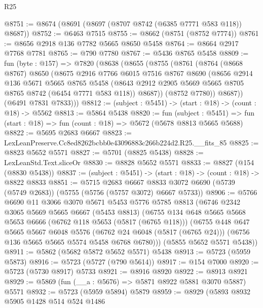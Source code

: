 \begin{lexlean}{R25}
\begin{coremodule}
@8751 := @8674 (@8691 (@8697 (@8707 @8742 (@6385 @7771 @583 @118)) @8687))
@8752 := @6463 @7515
@8755 := @8662 (@8751 (@8752 @7774))
@8761 := @8656 @2918 @136 @7782 @5665 @8650 @5458
@8764 := @8664 @2917 @7768 @7781
@8765 := @790 @7780
@8767 := @5436 @8765 @5458
@8809 := fun (byte : @157) =>
  @7820
    (@8638
      (@8655
        (@8755
          (@8761
            (@8764
              (@8668 @8767)
              @8650
              (@8675
                @2916
                @7766
                @6015
                @7516
                @8767
                @8690
                (@8656
                  @2914
                  @136
                  @5671
                  @5665
                  @8765
                  @5458
                  (@8643 @2912 @2905 @5669 @5665 @8705 @8765 @8742 (@6454 @7771 @583 @118))
                  @8687))
              (@8752 @7780))
            @8687))
        (@6491 @7831 @7833)))
@8812 := (subject : @5451) -> (start : @18) -> (count : @18) -> @5562
@8813 := @5864 @5438
@8820 := fun (subject : @5451) =>
  fun (start : @18) => fun (count : @18) => @5672 (@5678 @8813 @5665 @5688)
@8822 := @5695 @2683 @6667
@8823 := LexLeanPreserve.Cc8ed8262bcbb0e43096883c266b224d2.R25.__fits_85
@8825 := @8823 @5652 @5571
@8827 := @5701 (@8825 @5438)
@8828 := LexLeanStd.Text.sliceOr
@8830 := @8828 @5652 @5571
@8833 := @8827 (@154 (@8830 @5438))
@8837 := (subject : @5451) -> (start : @18) -> (count : @18) -> @8822 @8833
@8851 := @5715
    @2683
    @6667
    @8833
    @3072
    @6690
    (@5739 (@5749 @2683))
    (@5755 (@5756 (@5757 @3072) @6667 @5733))
@8906 := @5766
    @6690
    @11
    @3066
    @3070
    @5671
    @5453
    @5776
    @5785
    @8813
    (@6746
      @2342
      @3065
      @5669
      @5665
      @6667
      (@5453 @8813)
      (@6755
        @134
        @648
        @5665
        @5668
        @5653
        @6666
        (@6762 @118 @5653 (@5817 (@6765 @118)))
        (@6755
          @448
          @647
          @5665
          @5667
          @6048
          @5576
          (@6762 @24 @6048 (@5817 (@6765 @24)))
          (@6756 @136 @5665 @5665 @5574 @5458 @6768 @6780)))
      (@5855 @5652 @5571 @5438))
@8911 := @5862 (@5682 @5872 @5652 @5571) @5438
@8913 := @5723 (@5959 @5873)
@8916 := @5723 (@5727 (@790 @5614))
@8917 := @154 @7000
@8920 := @5723 (@5730 @8917) @5733
@8921 := @8916 @8920
@8922 := @8913 @8921
@8929 := @5869 (fun (__a : @5676) => @5871 @8922 @5881 @3070 @5887) @5571
@8932 := @5723 (@5959 @5894) @5879
@8959 := @8929
    (@5893
      @8932
      @5905
      @1428
      @514
      @524
      @1486

\end{coremodule}
\end{lexlean}
